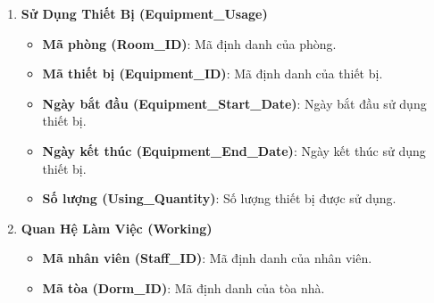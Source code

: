 \documentclass[a4paper,12pt]{article}
\begin{document}
\begin{enumerate}
    \item \textbf{Sử Dụng Thiết Bị (Equipment\_Usage)}
    \begin{itemize}
        \item \textbf{Mã phòng (Room\_ID)}: Mã định danh của phòng.
        \item \textbf{Mã thiết bị (Equipment\_ID)}: Mã định danh của thiết bị.
        \item \textbf{Ngày bắt đầu (Equipment\_Start\_Date)}: Ngày bắt đầu sử dụng thiết bị.
        \item \textbf{Ngày kết thúc (Equipment\_End\_Date)}: Ngày kết thúc sử dụng thiết bị.
        \item \textbf{Số lượng (Using\_Quantity)}: Số lượng thiết bị được sử dụng.
    \end{itemize}
    
    \item \textbf{Quan Hệ Làm Việc (Working)}
    \begin{itemize}
        \item \textbf{Mã nhân viên (Staff\_ID)}: Mã định danh của nhân viên.
        \item \textbf{Mã tòa (Dorm\_ID)}: Mã định danh của tòa nhà.
    \end{itemize}
\end{enumerate}
\end{document}
